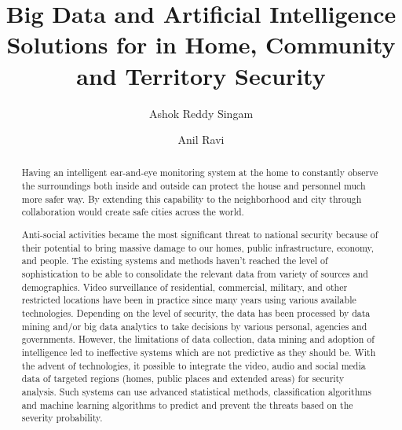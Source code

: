 \documentclass[sigconf]{acmart}
\begin{document}
\title{Big Data and Artificial Intelligence Solutions for in Home, Community and Territory Security}


\author{Ashok Reddy Singam}

\author{Anil Ravi}

\begin{abstract}
Having an intelligent ear-and-eye monitoring system at the home to constantly observe the surroundings both inside and outside can protect the house and personnel much more safer way. By extending this capability to the neighborhood and city through collaboration would create safe cities across the world.

Anti-social activities became the most significant threat to national security because of their potential to bring massive damage to our homes, public infrastructure, economy, and people. The existing systems and methods haven’t reached the level of sophistication to be able to consolidate the relevant data from variety of sources and demographics. Video surveillance of residential, commercial, military, and other restricted locations have been in practice since many years using various available technologies. Depending on the level of security, the data has been processed by data mining and/or big data analytics to take decisions by various personal, agencies and governments. However, the limitations of data collection, data mining and adoption of intelligence led to ineffective systems which are not predictive as they should be. With the advent of technologies, it possible to integrate the video, audio and social media data of targeted regions (homes, public places and extended areas) for security analysis. Such systems can use advanced statistical methods, classification algorithms and machine learning algorithms to predict and prevent the threats based on the severity probability.

\end{abstract}


\maketitle
\end{document}
